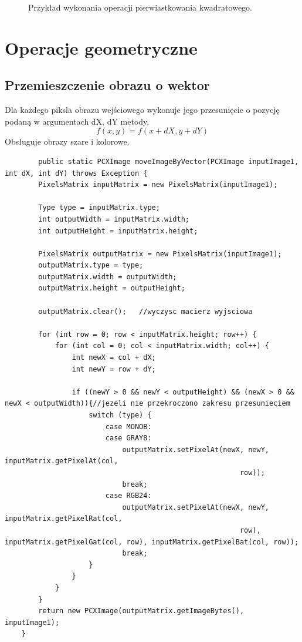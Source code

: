 \documentclass{article}
\begin{document}
\begin{figure}[!ht]
	\caption{Przykład wykonania operacji pierwiastkowania kwadratowego.}
	\label{fig9}	
	\end{figure}
	
	
	\section{Operacje geometryczne}
	\subsection{Przemieszczenie obrazu o wektor}
	Dla każdego piksla obrazu wejściowego wykonuje jego przesunięcie o pozycję podaną w argumentach dX, dY metody.
	\begin{equation*}
	f(x,y)=f(x+dX,y+dY)
	\end{equation*}
	Obsługuje obrazy szare i kolorowe.
	
	\begin{verbatim}
	    public static PCXImage moveImageByVector(PCXImage inputImage1, int dX, int dY) throws Exception { 
        PixelsMatrix inputMatrix = new PixelsMatrix(inputImage1);

        Type type = inputMatrix.type;
        int outputWidth = inputMatrix.width;
        int outputHeight = inputMatrix.height;

        PixelsMatrix outputMatrix = new PixelsMatrix(inputImage1);
        outputMatrix.type = type;
        outputMatrix.width = outputWidth;
        outputMatrix.height = outputHeight;

        outputMatrix.clear();   //wyczysc macierz wyjsciowa

        for (int row = 0; row < inputMatrix.height; row++) {
            for (int col = 0; col < inputMatrix.width; col++) {
                int newX = col + dX;
                int newY = row + dY;

                if ((newY > 0 && newY < outputHeight) && (newX > 0 && newX < outputWidth)){//jezeli nie przekroczono zakresu przesunieciem
                    switch (type) {
                        case MONOB:
                        case GRAY8:
                            outputMatrix.setPixelAt(newX, newY, inputMatrix.getPixelAt(col, 
														row));
                            break;
                        case RGB24:
                            outputMatrix.setPixelAt(newX, newY, inputMatrix.getPixelRat(col, 
														row), inputMatrix.getPixelGat(col, row), inputMatrix.getPixelBat(col, row));
                            break;
                    }
                }
            }
        }
        return new PCXImage(outputMatrix.getImageBytes(), inputImage1);
    }
	\end{verbatim}
\end{document}
